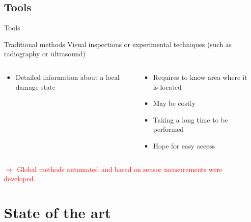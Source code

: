 \documentclass{beamer}
\begin{document}
\subsection{Tools}
\begin{frame}{Tools}
\begin{block}{Traditional methods}
Visual inspections or experimental techniques (such as radiography or ultrasound)
\end{block}

\begin{columns}
		\begin{column}{0.5\textwidth} 
		\begin{center}
			\begin{itemize}
				\item Detailed information about a local damage state
			\end{itemize}
		\end{center}
		\end{column}
		\begin{column}{0.5\textwidth}
		\begin{center}
			\begin{itemize}
				\item Requires to know area where it is located
				\item May be costly
				\item Taking a long time to be performed
				\item Hope for easy access
			\end{itemize}
		\end{center}
		\end{column}
	\end{columns}
	\pause
	\begin{center}
	\textcolor{red}{{\large 
$\Rightarrow$ Global methods automated and based on sensor measurements were developed.}}
	
	\end{center}

\end{frame}


\section{State of the art}
\end{document}
